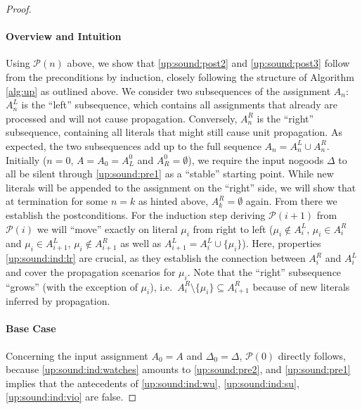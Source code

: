 \documentclass{vutinfth} %
\newcommand{\ass}{A}
\newcommand{\sgl}{\mu}
\begin{document}
\begin{proof}
\paragraph{Overview and Intuition} Using $\mathcal{P}(n)$ above, we show that \ref{up:sound:post2} and \ref{up:sound:post3} follow from the preconditions by induction, closely following the structure of Algorithm \ref{alg:up} as outlined above. We consider two subsequences of the assignment $A_n$: $\ass_n^L$ is the \enquote{left} subsequence, which contains all assignments that already are processed and will not cause propagation. Conversely, $\ass_n^R$ is the \enquote{right} subsequence, containing all literals that might still cause unit propagation. As expected, the two subsequences add up to the full sequence $A_n = A_n^L \cup A_n^R$. Initially ($n = 0$, $\ass = \ass_0 = \ass_L^0$ and $\ass_R^0 = \emptyset$), we require the input nogoods $\Delta$ to all be silent through \ref{up:sound:pre1} as a \enquote{stable} starting point. While new literals will be appended to the assignment on the \enquote{right} side, we will show that at termination for some $n = k$ as hinted above, $\ass_k^R = \emptyset$ again. From there we establish the postconditions. For the induction step deriving $\mathcal{P}(i + 1)$ from $\mathcal{P}(i)$ we will \enquote{move} exactly on literal $\sgl_i$ from right to left ($\sgl_i \not \in \ass_i^L$, $\sgl_i \in \ass_i^R$ and $\sgl_i \in \ass_{i+1}^L$, $\sgl_i \not \in \ass_{i+1}^R$ as well as $\ass_{i+1}^L = \ass_{i}^L \cup \{ \sgl_i \}$). Here, properties \ref{up:sound:ind:lr} are crucial, as they establish the connection between $A_i^R$ and $A_i^L$ and cover the propagation scenarios for $\sgl_i$. Note that the \enquote{right} subsequence \enquote{grows} (with the exception of $\sgl_i$), i.e.~$\ass_{i}^R \setminus \{ \sgl_i \} \subseteq \ass_{i+1}^R$ because of new literals inferred by propagation.

\paragraph{Base Case} Concerning the input assignment $\ass_0 = \ass$ and $\Delta_0 = \Delta$, $\mathcal{P}(0)$ directly follows, because \ref{up:sound:ind:watches} amounts to \ref{up:sound:pre2}, and \ref{up:sound:pre1} implies that the antecedents of \ref{up:sound:ind:wu}, \ref{up:sound:ind:su}, \ref{up:sound:ind:vio} are false.



\end{proof}
\end{document}
